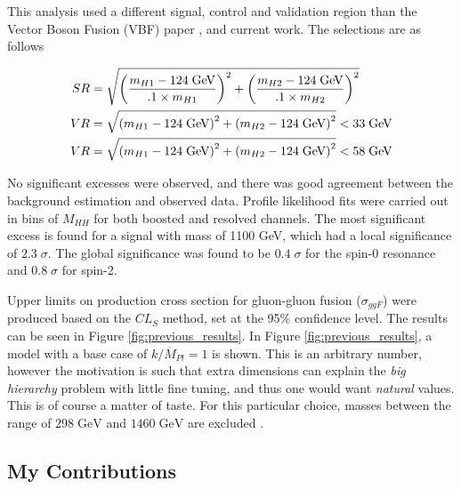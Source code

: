 \documentclass[12pt]{article}
\begin{document}
This analysis used a different signal, control and validation region than the
Vector Boson Fusion (VBF) paper \cite{atlas_hhbbbb_vbf}, and current work. The
selections are as follows

\begin{align} \label{eq:vbf_sr}
    SR &= \sqrt{\left( \frac{m_{H1} - 124\;\text{GeV}}{.1\times m_{H1} } \right)^2 +
    \left( \frac{m_{H2} - 124\;\text{GeV}}{.1\times m_{H2}} \right)^2} \\
    VR &= \sqrt{\left( m_{H1} - 124\;\text{GeV} \right)^2 + \left( m_{H2} -
    124\;\text{GeV} \right)^2} < 33\;\text{GeV} \\
    VR &= \sqrt{\left( m_{H1} - 124\;\text{GeV} \right)^2 + \left( m_{H2} -
    124\;\text{GeV} \right)^2} < 58\;\text{GeV}
\end{align}

No significant excesses were observed, and there was good agreement between the
background estimation and observed data. Profile likelihood fits were carried
out in bins of $M_{HH}$ for both boosted and resolved channels. The most
significant excess is found for a signal with mass of 1100 GeV, which had a
local significance of $2.3\;\sigma$. The global significance was found to be
$0.4\;\sigma$ for the spin-0 resonance and $0.8\;\sigma$ for spin-2.

Upper limits on production cross section for gluon-gluon fusion ($\sigma_{ggF}$)
were produced based on the $CL_S$ method, set at the 95\% confidence level. The
results can be seen in Figure \ref{fig:previous_results}. In Figure
\ref{fig:previous_results}, a model with a base case of $k/\overline{M}_{Pl}=1$
is shown. This is an arbitrary number, however the motivation is such that extra
dimensions can explain the \textit{big hierarchy} problem with little fine
tuning, and thus one would want \textit{natural} values. This is of course a
matter of taste. For this particular choice, masses between the range of
$298\;\text{GeV}$ and $1460\;\text{GeV}$ are excluded
\cite{atlas_resonant_2022}. 


\subsection{My Contributions}
\end{document}
